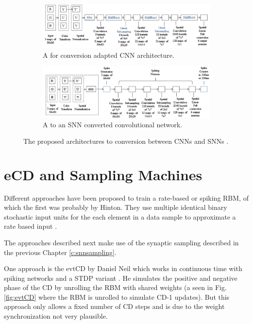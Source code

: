 \begin{figure}
	\centering
	\begin{subfigure}[t]{.50\textwidth}
  		\centering
  		\includegraphics[width=.9\linewidth]{imgs/cnn_snn_conv1.jpg}
  		\caption{A for conversion adapted CNN architecture.}
  		\label{fig:sub1}
	\end{subfigure}%
	\begin{subfigure}[t]{.50\textwidth}
  		\centering
  		\includegraphics[width=.9\linewidth]{imgs/cnn_snn_conv2.jpg}
  		\caption{A to an SNN converted convolutional network.}
  		\label{fig:sub2}
	\end{subfigure}
	\caption{The proposed architectures to conversion between CNNs and SNNs \cite{Cao2014}. }
	\label{fig:csnnconv}
\end{figure}

\section{eCD and Sampling Machines} \label{c:ecd}

Different approaches have been proposed to train a rate-based or spiking RBM, of which the first was probably by Hinton.
They use multiple identical binary stochastic input units for the each element in a data sample to approximate a rate based input \cite{Teh2005}.

The approaches described next make use of the synaptic sampling described in the previous Chapter \ref{c:snnsampling}.

One approach is the evtCD by Daniel Neil which works in continuous time with spiking networks and a STDP variant \cite{Diehl2015}.
He simulates the positive and negative phase of the CD by unrolling the RBM with shared weights (a seen in Fig. \ref{fig:evtCD} where the RBM is unrolled to simulate CD-1 updates). 
But this approach only allows a fixed number of CD steps and is due to the weight synchronization not very plausible.

